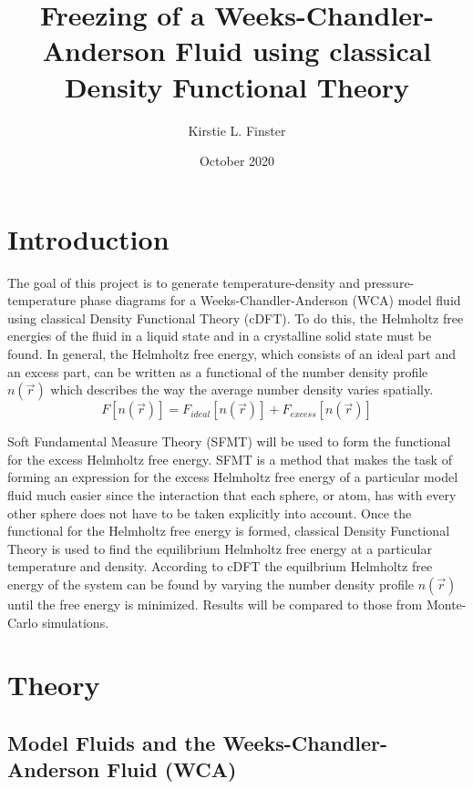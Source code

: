 \documentclass[double,12pt]{beavtex}
\title{Freezing of a Weeks-Chandler-Anderson Fluid using classical Density Functional Theory}
\author{Kirstie L. Finster}
\date{October 2020}
\begin{document}
   \maketitle
   \mainmatter

\chapter{Introduction}

The goal of this project is to generate temperature-density 
and pressure-temperature phase diagrams for a Weeks-Chandler-Anderson (WCA) 
model fluid using classical Density Functional Theory (cDFT). 
To do this, the Helmholtz free energies of the fluid
in a liquid state and in a crystalline solid state must be found.
In general, the Helmholtz free energy, which consists of an ideal part 
and an excess part, can be written as a functional of the number density 
profile $n(\vec{r})$ which describes the way the average number 
density varies spatially. 
\begin{equation}{F[n(\vec{r})]=F_{ideal}[n(\vec{r})] + F_{excess}[n(\vec{r})]}\end{equation} 

Soft Fundamental Measure Theory (SFMT) will be used to form the 
functional for the excess Helmholtz free energy. 
SFMT is a method that makes the task of 
forming an expression for the excess Helmholtz free energy of a particular 
model fluid much easier since the interaction that each sphere, or atom, 
has with every other sphere does not have to be taken explicitly into account.
Once the functional for the Helmholtz free energy is formed, classical 
Density Functional Theory is used to find the equilibrium 
Helmholtz free energy at a particular temperature and density. 
According to cDFT the equilbrium 
Helmholtz free energy of the system can be found by varying the number 
density profile $n(\vec{r})$ until the free energy is minimized. 
Results will be compared to those from Monte-Carlo simulations.

\chapter{Theory}

\section{Model Fluids and the Weeks-Chandler-Anderson Fluid (WCA)}
\end{document}

